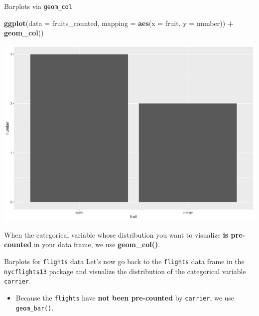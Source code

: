 \documentclass[
  ignorenonframetext,
]{beamer}
\newenvironment{Shaded}{\begin{snugshade}}{\end{snugshade}}
\newcommand{\AttributeTok}[1]{\textcolor[rgb]{0.13,0.29,0.53}{#1}}
\newcommand{\FunctionTok}[1]{\textcolor[rgb]{0.13,0.29,0.53}{\textbf{#1}}}
\newcommand{\NormalTok}[1]{#1}
\newcommand{\SpecialCharTok}[1]{\textcolor[rgb]{0.81,0.36,0.00}{\textbf{#1}}}
\providecommand{\tightlist}{%
  \setlength{\itemsep}{0pt}\setlength{\parskip}{0pt}}
\begin{document}
\begin{frame}[fragile]{Barplots via \texttt{geom\_col}}
\protect\hypertarget{barplots-via-geom_col}{}
\tiny

\begin{Shaded}
\begin{Highlighting}[]
\FunctionTok{ggplot}\NormalTok{(}\AttributeTok{data =}\NormalTok{ fruits\_counted, }\AttributeTok{mapping =} \FunctionTok{aes}\NormalTok{(}\AttributeTok{x =}\NormalTok{ fruit, }\AttributeTok{y =}\NormalTok{ number)) }\SpecialCharTok{+}
  \FunctionTok{geom\_col}\NormalTok{()}
\end{Highlighting}
\end{Shaded}

\begin{center}\includegraphics[width=0.9\linewidth,height=0.5\textheight]{Week2_Lect_files/figure-beamer/unnamed-chunk-39-1} \end{center}
\normalsize

When the categorical variable whose distribution you want to visualize
\textbf{is pre-counted} in your data frame, we use \textbf{geom\_col()}.
\end{frame}

\begin{frame}[fragile]{Barplots for \texttt{flights} data}
\protect\hypertarget{barplots-for-flights-data}{}
Let's now go back to the \texttt{flights} data frame in the
\texttt{nycflights13} package and visualize the distribution of the
categorical variable \texttt{carrier}.

\begin{itemize}
\tightlist
\item
  Because the \texttt{flights} have \textbf{not been pre-counted} by
  \texttt{carrier}, we use \texttt{geom\_bar()}.
\end{itemize}
\end{frame}
\end{document}
